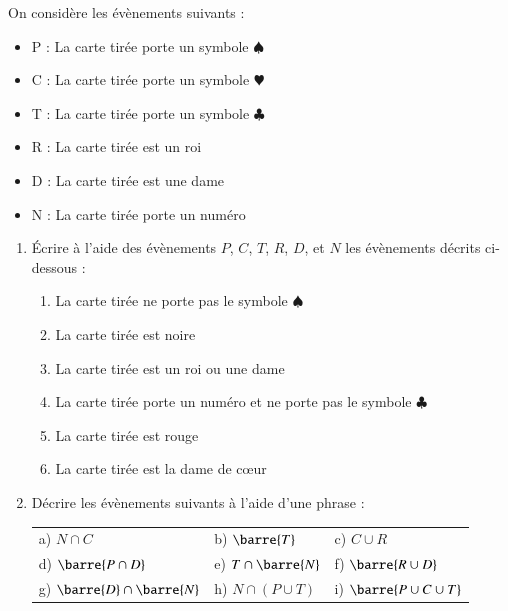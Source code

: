 \documentclass[oneside,12pt]{article}          %
\begin{document}
On considère les évènements suivants :
\begin{itemize}[label=$\bullet$]
    \item P : \og La carte tirée porte un symbole $\spadesuit$ \fg
    \item C : \og La carte tirée porte un symbole \textcolor{newred}{\large $\varheartsuit$} \fg
    \item T : \og La carte tirée porte un symbole $\clubsuit$ \fg
    \item R : \og La carte tirée est un roi \fg
    \item D : \og La carte tirée est une dame \fg
    \item N : \og La carte tirée porte un numéro \fg
\end{itemize} \vspace{-2mm}
\begin{enumerate}
    \item Écrire à l'aide des évènements $P$, $C$, $T$, $R$, $D$, et $N$ les évènements décrits ci-dessous :
    \begin{enumerate}
        \item \og La carte tirée ne porte pas le symbole $\spadesuit$ \fg
        \item \og La carte tirée est noire \fg
        \item \og La carte tirée est un roi ou une dame \fg
        \item \og La carte tirée porte un numéro et ne porte pas le symbole $\clubsuit$ \fg
        \item \og La carte tirée est rouge \fg
        \item \og La carte tirée est la dame de cœur \fg
    \end{enumerate}
\item Décrire les évènements suivants à l'aide d'une phrase : \\
    \renewcommand{\arraystretch}{1.25}
    \begin{tabular}{p{} p{} p{}}
         a) $N\cap C$ & b) $\barre{T}$ & c) $C\cup R $ \\
         d) $\barre{P\cap D}$ & e) $T\cap\barre{N}$ & f) $\barre{R\cup D}$ \\
         g) $\barre{D}\cap\barre{N}$ & h) $N \cap (P \cup T)$ & i) $\barre{P\cup C\cup T}$ 
    \end{tabular}
\end{enumerate}
\end{document}
